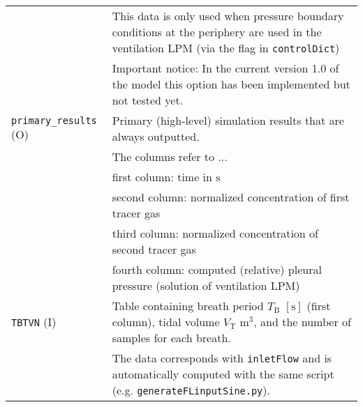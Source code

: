 \begin{tabular}{L{0.25\textwidth} L{0.75\textwidth}}
                          & This data is only used when pressure boundary conditions at the periphery are used in the ventilation LPM (via the flag in \texttt{controlDict}) \\
                          & Important notice: In the current version 1.0 of the model this option has been implemented but not tested yet. \\
  \midrule
  \texttt{primary\_results} (O) & Primary (high-level) simulation results that are always outputted. \\
                          & The columns refer to ... \\
                          & first column: time in $\mathrm{s}$ \\
                          & second column: normalized concentration of first tracer gas \\
                          & third column: normalized concentration of second tracer gas \\
                          & fourth column: computed (relative) pleural pressure (solution of ventilation LPM) \\
  \midrule
  \texttt{TBTVN} (I)      & Table containing breath period $T_\mathrm{B}$  $[\mathrm{s}]$ (first column), tidal volume $V_\mathrm{T}$ $\mathrm{m^3}$, and the number of samples for each breath. \\
                          & The data corresponds with \texttt{inletFlow} and is automatically computed with the same script (e.g. \texttt{generateFLinputSine.py}). \\
  \bottomrule
\end{tabular}

